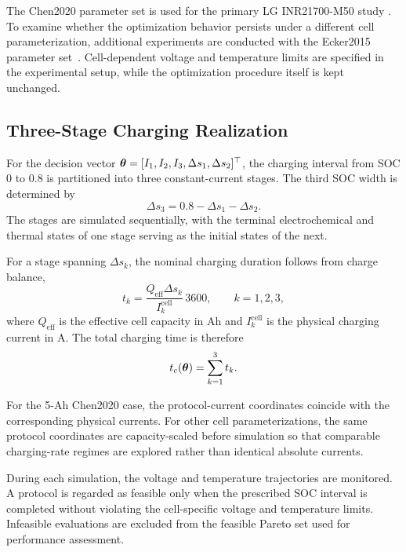The Chen2020 parameter set is used for the primary LG INR21700-M50 study
\cite{ref8}. To examine whether the optimization behavior persists under a
different cell parameterization, additional experiments are conducted with the
Ecker2015 parameter set~\cite{ref9}. Cell-dependent voltage and temperature
limits are specified in the experimental setup, while the optimization
procedure itself is kept unchanged.

\subsection{Three-Stage Charging Realization}

For the decision vector
$\boldsymbol{\theta}=[I_1,I_2,I_3,\Delta s_1,\Delta s_2]^\top$, the charging interval from
SOC $0$ to $0.8$ is partitioned into three constant-current stages. The third
SOC width is determined by
\begin{equation}
\Delta s_3
=
0.8-\Delta s_1-\Delta s_2.
\label{eq:dsoc3_model}
\end{equation}
The stages are simulated sequentially, with the terminal electrochemical and
thermal states of one stage serving as the initial states of the next.

For a stage spanning $\Delta s_k$, the nominal charging duration follows from
charge balance,
\begin{equation}
t_k
=
\frac{Q_{\mathrm{eff}}\Delta s_k}
{I_k^{\mathrm{cell}}}\,3600,
\qquad k=1,2,3,
\label{eq:stage_time}
\end{equation}
where $Q_{\mathrm{eff}}$ is the effective cell capacity in Ah and
$I_k^{\mathrm{cell}}$ is the physical charging current in A. The total charging
time is therefore
\begin{equation}
t_c(\boldsymbol{\theta})=\sum_{k=1}^{3} t_k .
\label{eq:charge_time}
\end{equation}

For the 5-Ah Chen2020 case, the protocol-current coordinates coincide with the
corresponding physical currents. For other cell parameterizations, the same
protocol coordinates are capacity-scaled before simulation so that comparable
charging-rate regimes are explored rather than identical absolute currents.

During each simulation, the voltage and temperature trajectories are monitored.
A protocol is regarded as feasible only when the prescribed SOC interval is
completed without violating the cell-specific voltage and temperature limits.
Infeasible evaluations are excluded from the feasible Pareto set used for
performance assessment.

